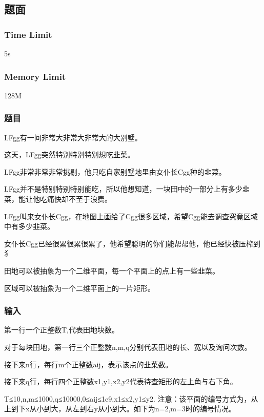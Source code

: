 \subsection{题面}

\subsubsection{Time Limit}
5s

\subsubsection{Memory Limit}
128M

\subsubsection{题目}
LFgg有一间非常大非常大非常大的大别墅。

这天，LFgg突然特别特别特别想吃韭菜。

LFgg非常非常非常挑剔，他只吃自家别墅地里由女仆长Cgg种的韭菜。

LFgg并不是特别特别特别能吃，所以他想知道，一块田中的一部分上有多少韭菜，能让他吃痛快却不至于浪费。

LFgg叫来女仆长Cgg，在地图上画给了Cgg很多区域，希望Cgg能去调查究竟区域中有多少韭菜。

女仆长Cgg已经很累很累很累了，他希望聪明的你们能帮帮他，他已经快被压榨到犭

田地可以被抽象为一个二维平面，每一个平面上的点上有一些韭菜。

区域可以被抽象为一个二维平面上的一片矩形。

\subsubsection{输入}
第一行一个正整数T,代表田地块数。

对于每块田地，第一行三个正整数n,m,q分别代表田地的长、宽以及询问次数。

接下来n行，每行m个正整数aij，表示该点的韭菜数。

接下来q行，每行四个正整数x1,y1,x2,y2代表待查矩形的左上角与右下角。

T≤10,n,m≤1000,q≤10000,0≤aij≤1e9,x1≤x2,y1≤y2.
注意：该平面的编号方式为，从上到下x从小到大，从左到右y从小到大。如下为n=2,m=3时的编号情况。

